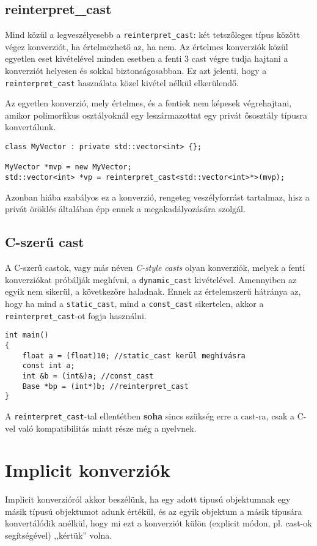 \documentclass[a4paper,11.5pt,table]{article}
\begin{document}
	\subsection{reinterpret\_cast}
	Mind közül a legveszélyesebb a \texttt{reinterpret\_cast}: két tetszőleges típus között végez konverziót, ha értelmezhető az, ha nem. Az értelmes konverziók közül egyetlen eset kivételével minden esetben a fenti 3 cast végre tudja hajtani a konverziót helyesen és sokkal biztonságosabban. Ez azt jelenti, hogy a \texttt{reinterpret\_cast} használata közel kivétel nélkül elkerülendő.
	
	\smallskip
	Az egyetlen konverzió, mely értelmes, és a fentiek nem képesek végrehajtani, amikor polimorfikus osztályoknál egy leszármazottat egy privát ősosztály típusra konvertálunk.
	\begin{lstlisting}
class MyVector : private std::vector<int> {};

MyVector *mvp = new MyVector;
std::vector<int> *vp = reinterpret_cast<std::vector<int>*>(mvp);
	\end{lstlisting}
	Azonban hiába szabályos ez a konverzió, rengeteg veszélyforrást tartalmaz, hisz a privát öröklés általában épp ennek a megakadályozására szolgál.
	\subsection{C-szerű cast}
	A C-szerű castok, vagy más néven \textit{C-style casts} olyan konverziók, melyek a fenti konverziókat próbálják meghívni, a \texttt{dynamic\_cast} kivételével. Amennyiben az egyik nem sikerül, a következőre haladnak. Ennek az értelemszerű hátránya az, hogy ha mind a \texttt{static\_cast}, mind a \texttt{const\_cast} sikertelen, akkor a \texttt{reinterpret\_cast}-ot fogja használni.
	\begin{lstlisting}
int main()
{
	float a = (float)10; //static_cast kerül meghívásra
	const int a;
	int &b = (int&)a; //const_cast
	Base *bp = (int*)b; //reinterpret_cast 
}
	\end{lstlisting}
	A \texttt{reinterpret\_cast}-tal ellentétben \textbf{soha} sincs szükség erre a cast-ra, csak a C-vel való kompatibilitás miatt része még a nyelvnek.
	\section{Implicit konverziók}
	Implicit konverzióról akkor beszélünk, ha egy adott típusú objektumnak egy másik típusú objektumot adunk értékül, és az egyik objektum a másik típusára konvertálódik anélkül, hogy mi ezt a konverziót külön (explicit módon, pl. cast-ok segítségével) ,,kértük'' volna.
	
\end{document}
